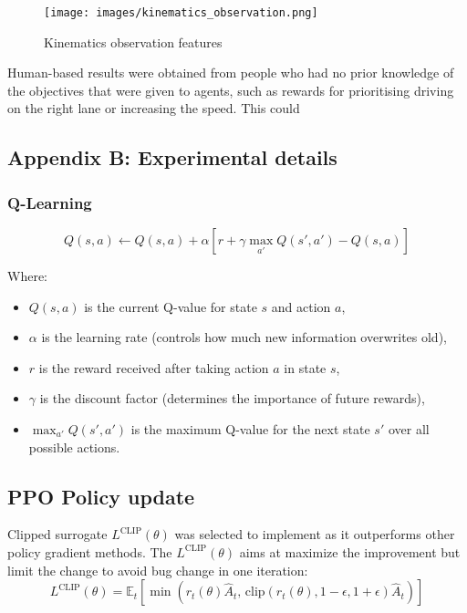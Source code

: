 \documentclass{article}
\begin{document}
\begin{figure}[h!]
    \centering
    \texttt{[image: images/kinematics\_observation.png]}
    \caption{Kinematics observation features~\cite{leurent_social_2019}}
    \label{appendix:kinematics observation}
\end{figure}

Human-based results were obtained from people who had no prior knowledge of the objectives that were given to agents, such as rewards for prioritising driving on the right lane or increasing the speed. This could 

\subsection*{Appendix B: Experimental details}
\label{sec:experimental_details}

\subsubsection{Q-Learning}
\label{appendix:q_learning_details}

$$Q(s, a) \leftarrow Q(s, a) + \alpha \left[ r + \gamma \max_{a'} Q(s', a') - Q(s, a) \right]$$

Where:
\begin{itemize}
    \item $Q(s, a)$ is the current Q-value for state \( s \) and action \( a \),
    \item $\alpha$ is the learning rate (controls how much new information overwrites old),
    \item  $r$ is the reward received after taking action $a$ in state  $s$,
    \item $\gamma$ is the discount factor (determines the importance of future rewards),
    \item  $\max_{a'} Q(s', a') $ is the maximum Q-value for the next state  $s'$  over all possible actions.
\end{itemize}

\subsection{PPO Policy update}
\label{appendix:ppo}
Clipped surrogate $L^{\text{CLIP}}(\theta)$ was selected to implement as it outperforms other policy gradient methods\cite{schulman_proximal_2017}. The $L^{\text{CLIP}}(\theta)$ aims at maximize the improvement but limit the change to avoid bug change in one iteration:
\begin{equation}
    L^{\text{CLIP}}(\theta) = \mathbb{E}_t \left[ \min \left( r_t(\theta) \hat{A}_t, \, \text{clip} \left( r_t(\theta), 1 - \epsilon, 1 + \epsilon \right) \hat{A}_t \right) \right]
\end{equation}
\end{document}
